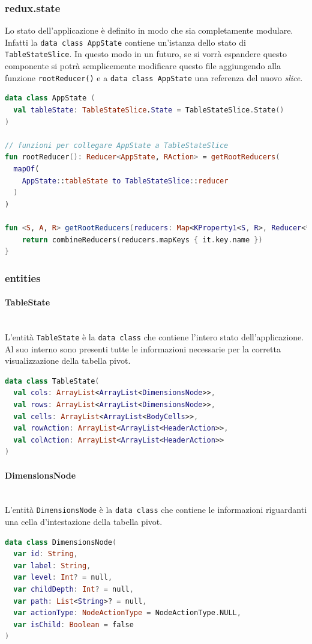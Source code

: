 \subsubsection{redux.state}
Lo stato dell'applicazione è definito in modo che sia completamente modulare. Infatti la \verb|data class AppState| contiene un'istanza dello stato di \verb|TableStateSlice|. In questo modo in un futuro, se si vorrà espandere questo componente si potrà semplicemente modificare questo file aggiungendo alla funzione \verb|rootReducer()| e a \verb|data class AppState| una referenza del nuovo \emph{slice}.
\begin{lstlisting}[caption={AppState}, label={lst:appstate}, language=Kotlin]
data class AppState (
  val tableState: TableStateSlice.State = TableStateSlice.State()
)

// funzioni per collegare AppState a TableStateSlice
fun rootReducer(): Reducer<AppState, RAction> = getRootReducers(
  mapOf(
    AppState::tableState to TableStateSlice::reducer
  )
)

fun <S, A, R> getRootReducers(reducers: Map<KProperty1<S, R>, Reducer<*, A>>): Reducer<S, A> {
	return combineReducers(reducers.mapKeys { it.key.name })
}
\end{lstlisting}

\subsubsection{entities}
\paragraph*{TableState} \mbox{} \\
L'entità \verb|TableState| è la \verb|data class| che contiene l'intero stato dell'applicazione. Al suo interno sono presenti tutte le informazioni necessarie per la corretta visualizzazione della tabella pivot.
\begin{lstlisting}[caption={TableState}, label={lst:tablestate}, language=Kotlin]
data class TableState(
  val cols: ArrayList<ArrayList<DimensionsNode>>,
  val rows: ArrayList<ArrayList<DimensionsNode>>,
  val cells: ArrayList<ArrayList<BodyCells>>,
  val rowAction: ArrayList<ArrayList<HeaderAction>>,
  val colAction: ArrayList<ArrayList<HeaderAction>>
)
\end{lstlisting}

\paragraph*{DimensionsNode} \mbox{} \\
L'entità \verb|DimensionsNode| è la \verb|data class| che contiene le informazioni riguardanti una cella d'intestazione della tabella pivot.
\begin{lstlisting}[caption={DimensionsNode}, label={lst:dimensionsnode}, language=Kotlin]
data class DimensionsNode(
  var id: String,
  var label: String,
  var level: Int? = null,
  var childDepth: Int? = null,
  var path: List<String>? = null,
  var actionType: NodeActionType = NodeActionType.NULL,
  var isChild: Boolean = false
)
\end{lstlisting}

